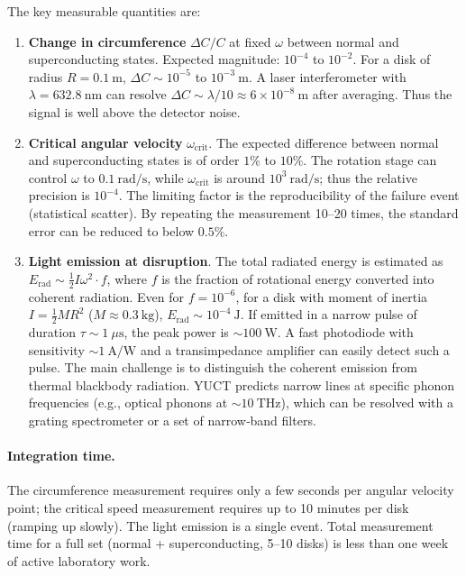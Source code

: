 \documentclass[12pt,a4paper]{article}
\begin{document}
The key measurable quantities are:
\begin{enumerate}
	\item \textbf{Change in circumference} \(\Delta C/C\) at fixed \(\omega\) between normal and superconducting states. Expected magnitude: \(10^{-4}\) to \(10^{-2}\). For a disk of radius \(R = 0.1\ \text{m}\), \(\Delta C \sim 10^{-5}\) to \(10^{-3}\ \text{m}\). A laser interferometer with \(\lambda = 632.8\ \text{nm}\) can resolve \(\Delta C \sim \lambda/10 \approx 6\times10^{-8}\ \text{m}\) after averaging. Thus the signal is well above the detector noise.
	
	\item \textbf{Critical angular velocity} \(\omega_{\text{crit}}\). The expected difference between normal and superconducting states is of order \(1\%\) to \(10\%\). The rotation stage can control \(\omega\) to \(0.1\ \text{rad/s}\), while \(\omega_{\text{crit}}\) is around \(10^3\ \text{rad/s}\); thus the relative precision is \(10^{-4}\). The limiting factor is the reproducibility of the failure event (statistical scatter). By repeating the measurement 10–20 times, the standard error can be reduced to below \(0.5\%\).
	
	\item \textbf{Light emission at disruption}. The total radiated energy is estimated as \(E_{\text{rad}} \sim \frac{1}{2} I \omega^2 \cdot f\), where \(f\) is the fraction of rotational energy converted into coherent radiation. Even for \(f = 10^{-6}\), for a disk with moment of inertia \(I = \frac{1}{2} M R^2\) (\(M \approx 0.3\ \text{kg}\)), \(E_{\text{rad}} \sim 10^{-4}\ \text{J}\). If emitted in a narrow pulse of duration \(\tau \sim 1\ \mu\text{s}\), the peak power is \(\sim 100\ \text{W}\). A fast photodiode with sensitivity \(\sim 1\ \text{A/W}\) and a transimpedance amplifier can easily detect such a pulse. The main challenge is to distinguish the coherent emission from thermal blackbody radiation. YUCT predicts narrow lines at specific phonon frequencies (e.g., optical phonons at \(\sim 10\ \text{THz}\)), which can be resolved with a grating spectrometer or a set of narrow‑band filters.
\end{enumerate}

\paragraph{Integration time.}
The circumference measurement requires only a few seconds per angular velocity point; the critical speed measurement requires up to 10 minutes per disk (ramping up slowly). The light emission is a single event. Total measurement time for a full set (normal + superconducting, 5–10 disks) is less than one week of active laboratory work.
\end{document}
